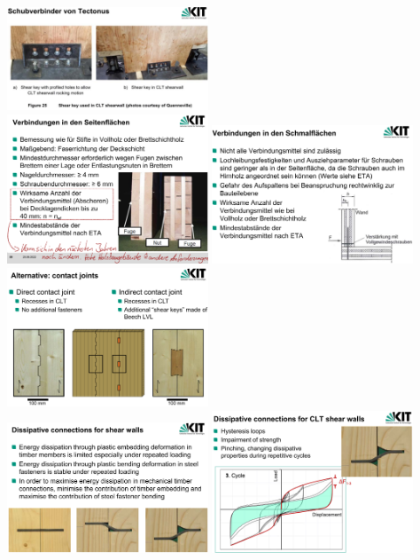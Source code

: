 \documentclass[fleqn,twoside]{article}
\begin{document}
\begin{itemize}
        \includegraphics[width=0.45\textwidth]{Grafiken/CLT-Verbindungen/Tectonus Schubverbinder.png}\\
        \includegraphics[width=0.45\textwidth]{Grafiken/CLT-Verbindungen/Verbindungen SeitenflÃ¤chen.png}
        \includegraphics[width=0.45\textwidth]{Grafiken/CLT-Verbindungen/Verbindungen Schmalflaechen.png}\\
        \includegraphics[width=0.45\textwidth]{Grafiken/CLT-Verbindungen/Contact joints.png}\\
        \includegraphics[width=0.45\textwidth]{Grafiken/CLT-Verbindungen/Dissipative joints.png}
        \includegraphics[width=0.45\textwidth]{Grafiken/CLT-Verbindungen/Dissipative joints hysteresis.png}\\
        

\end{itemize}
\end{document}
